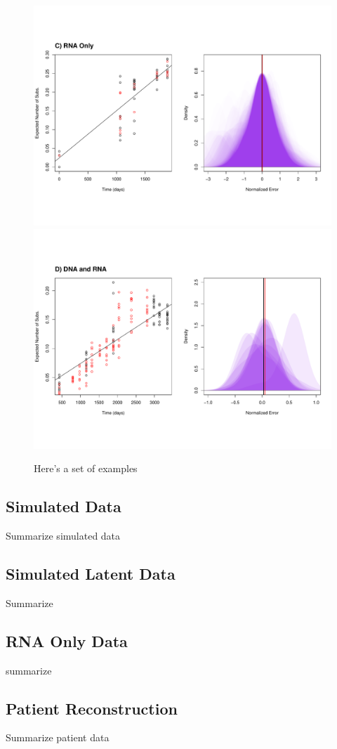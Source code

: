 \begin{figure}[!ht]
	\includegraphics[trim=0cm 0cm 0cm 7cm, clip=true,scale=0.25]{figures/ancre.pdf}\\
	\includegraphics[trim=0cm 4cm 0cm 7cm, clip=true,scale=0.25]{figures/lanl.pdf}
	\caption[Examples]{Here's a set of examples}
\end{figure}


\subsection{Simulated Data} \label{sec:sim_results}
Summarize simulated data

\subsection{Simulated Latent Data} \label{sec:sim_lat_results}
Summarize


\subsection{RNA Only Data} \label{sec:rna_only}
summarize 

\subsection{Patient Reconstruction}
Summarize patient data


